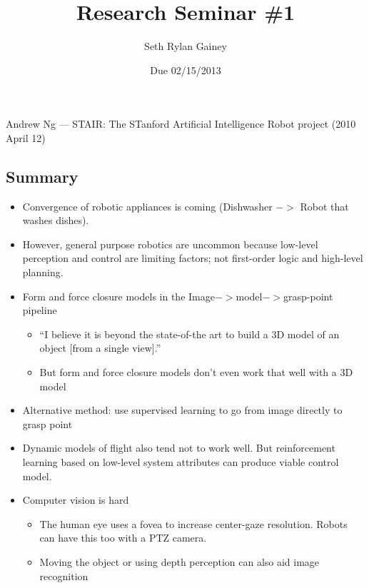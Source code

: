 \documentclass[9pt,letterpaper]{article}
\title{Research Seminar \#1}
\author{Seth Rylan Gainey}
\date{Due 02/15/2013}
\begin{document}


\maketitle{}

\subsection*{} 

Andrew Ng --- STAIR: The STanford Artificial Intelligence Robot project\cite{AndrewNg} (2010 April 12)

\subsection*{Summary}

\begin{itemize}
\addtolength{\itemsep}{-0.5\baselineskip}
\item Convergence of robotic appliances is coming (Dishwasher $->$ Robot that washes dishes).
\item However, general purpose robotics are uncommon because low-level perception and control are limiting factors; not first-order logic and high-level planning.
\item Form and force closure models in the Image$->$model$->$grasp-point pipeline 
\begin{itemize}
\addtolength{\itemsep}{-0.5\baselineskip}
\item ``I believe it is beyond the state-of-the art to build a 3D model of an object [from a single view].''
\item But form and force closure models don't even work that well with a 3D model
\end{itemize}
\item Alternative method: use supervised learning to go from image directly to grasp point
\item Dynamic models of flight also tend not to work well. But reinforcement learning based on low-level system attributes can produce viable control model.
\item Computer vision is hard
\begin{itemize}
\addtolength{\itemsep}{-0.5\baselineskip}
\item The human eye uses a fovea to increase center-gaze resolution. Robots can have this too with a PTZ camera.
\item Moving the object or using depth perception can also aid image recognition

\end{itemize}
\end{itemize}
\end{document}
